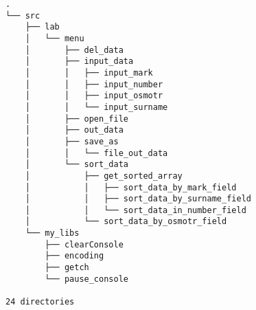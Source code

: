 {

\scriptsize

\begin{verbatim}
.
└── src
    ├── lab
    │   └── menu
    │       ├── del_data
    │       ├── input_data
    │       │   ├── input_mark
    │       │   ├── input_number
    │       │   ├── input_osmotr
    │       │   └── input_surname
    │       ├── open_file
    │       ├── out_data
    │       ├── save_as
    │       │   └── file_out_data
    │       └── sort_data
    │           ├── get_sorted_array
    │           │   ├── sort_data_by_mark_field
    │           │   ├── sort_data_by_surname_field
    │           │   └── sort_data_in_number_field
    │           └── sort_data_by_osmotr_field
    └── my_libs
        ├── clearConsole
        ├── encoding
        ├── getch
        └── pause_console

24 directories
\end{verbatim}

}